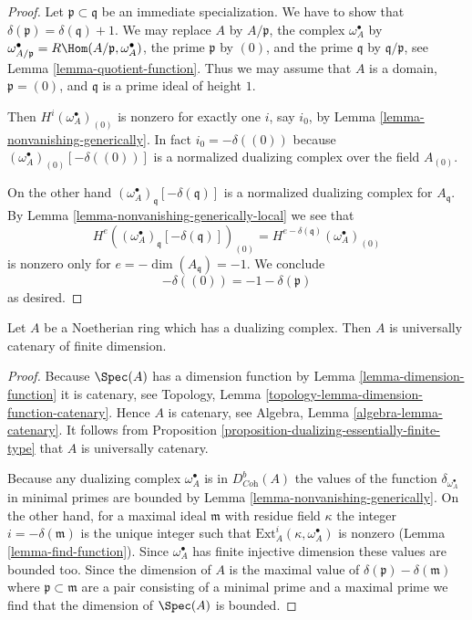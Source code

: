 \begin{proof}
Let $\mathfrak p \subset \mathfrak q$ be an immediate specialization.
We have to show that $\delta(\mathfrak p) = \delta(\mathfrak q) + 1$.
We may replace $A$ by $A/\mathfrak p$, the complex $\omega_A^\bullet$ by
$\omega_{A/\mathfrak p}^\bullet = R\Hom(A/\mathfrak p, \omega_A^\bullet)$,
the prime $\mathfrak p$ by $(0)$, and the prime $\mathfrak q$
by $\mathfrak q/\mathfrak p$,
see Lemma \ref{lemma-quotient-function}. Thus we may assume that
$A$ is a domain, $\mathfrak p = (0)$, and $\mathfrak q$ is a prime
ideal of height $1$.

\medskip\noindent
Then $H^i(\omega_A^\bullet)_{(0)}$ is nonzero
for exactly one $i$, say $i_0$, by Lemma \ref{lemma-nonvanishing-generically}.
In fact $i_0 = -\delta((0))$ because
$(\omega_A^\bullet)_{(0)}[-\delta((0))]$
is a normalized dualizing complex over the field $A_{(0)}$.

\medskip\noindent
On the other hand $(\omega_A^\bullet)_\mathfrak q[-\delta(\mathfrak q)]$
is a normalized dualizing complex for $A_\mathfrak q$. By
Lemma \ref{lemma-nonvanishing-generically-local}
we see that
$$
H^e((\omega_A^\bullet)_\mathfrak q[-\delta(\mathfrak q)])_{(0)} =
H^{e - \delta(\mathfrak q)}(\omega_A^\bullet)_{(0)}
$$
is nonzero only for $e = -\dim(A_\mathfrak q) = -1$.
We conclude
$$
-\delta((0)) = -1 - \delta(\mathfrak p)
$$
as desired.
\end{proof}

\begin{lemma}
\label{lemma-universally-catenary}
Let $A$ be a Noetherian ring which has a dualizing
complex. Then $A$ is universally catenary of finite dimension.
\end{lemma}

\begin{proof}
Because $\Spec(A)$ has a dimension function by
Lemma \ref{lemma-dimension-function}
it is catenary, see
Topology, Lemma \ref{topology-lemma-dimension-function-catenary}.
Hence $A$ is catenary, see
Algebra, Lemma \ref{algebra-lemma-catenary}.
It follows from
Proposition \ref{proposition-dualizing-essentially-finite-type}
that $A$ is universally catenary.

\medskip\noindent
Because any dualizing complex $\omega_A^\bullet$ is
in $D^b_{\textit{Coh}}(A)$ the values of the function
$\delta_{\omega_A^\bullet}$ in minimal primes are bounded by
Lemma \ref{lemma-nonvanishing-generically}.
On the other hand, for a maximal ideal $\mathfrak m$ with
residue field $\kappa$ the integer $i = -\delta(\mathfrak m)$
is the unique integer such that
$\text{Ext}_A^i(\kappa, \omega_A^\bullet)$ is nonzero
(Lemma \ref{lemma-find-function}).
Since $\omega_A^\bullet$ has finite injective dimension
these values are bounded too. Since the dimension of
$A$ is the maximal value of $\delta(\mathfrak p) - \delta(\mathfrak m)$
where $\mathfrak p \subset \mathfrak m$ are a pair
consisting of a minimal prime and a maximal prime we find that the
dimension of $\Spec(A)$ is bounded.
\end{proof}

